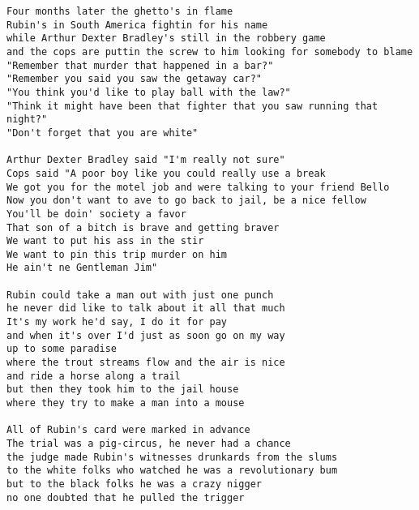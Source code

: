 \documentclass[a4paper]{article}
\begin{document}
\begin{Verbatim}[commandchars=\\\{\}]
Four months later the ghetto's in flame
Rubin's in South America fightin for his name
while Arthur Dexter Bradley's still in the robbery game
and the cops are puttin the screw to him looking for somebody to blame
"Remember that murder that happened in a bar?"
"Remember you said you saw the getaway car?"
"You think you'd like to play ball with the law?"
"Think it might have been that fighter that you saw running that night?"
"Don't forget that you are white"

Arthur Dexter Bradley said "I'm really not sure"
Cops said "A poor boy like you could really use a break
We got you for the motel job and were talking to your friend Bello
Now you don't want to ave to go back to jail, be a nice fellow
You'll be doin' society a favor
That son of a bitch is brave and getting braver
We want to put his ass in the stir
We want to pin this trip murder on him
He ain't ne Gentleman Jim"

Rubin could take a man out with just one punch
he never did like to talk about it all that much
It's my work he'd say, I do it for pay
and when it's over I'd just as soon go on my way
up to some paradise
where the trout streams flow and the air is nice
and ride a horse along a trail
but then they took him to the jail house
where they try to make a man into a mouse

All of Rubin's card were marked in advance
The trial was a pig-circus, he never had a chance
the judge made Rubin's witnesses drunkards from the slums
to the white folks who watched he was a revolutionary bum
but to the black folks he was a crazy nigger
no one doubted that he pulled the trigger
\end{Verbatim}
\newpage
\end{document}
